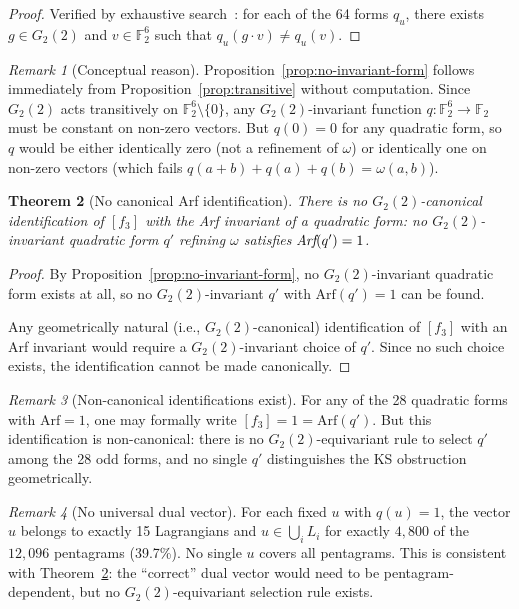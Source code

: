 \documentclass[11pt,a4paper]{article}
\newtheorem{theorem}{Theorem}[section]
\theoremstyle{remark}
\newtheorem{remark}[theorem]{Remark}
\newcommand{\F}{\mathbb{F}}
\begin{document}
\begin{proof}
Verified by exhaustive search~\cite{PaperXIIsuppl}: for each of the 64
forms $q_u$, there exists $g \in G_2(2)$ and $v \in \F_2^6$ such that
$q_u(g \cdot v) \neq q_u(v)$.
\end{proof}

\begin{remark}[Conceptual reason]
\label{rem:conceptual}
Proposition~\ref{prop:no-invariant-form} follows immediately from
Proposition~\ref{prop:transitive} without computation. Since $G_2(2)$
acts transitively on $\F_2^6 \setminus \{0\}$, any $G_2(2)$-invariant
function $q: \F_2^6 \to \F_2$ must be constant on non-zero vectors.
But $q(0) = 0$ for any quadratic form, so $q$ would be either
identically zero (not a refinement of $\omega$) or identically one on
non-zero vectors (which fails $q(a+b) + q(a) + q(b) = \omega(a,b)$).
\end{remark}

\begin{theorem}[No canonical Arf identification]
\label{thm:arf-fails}
There is no $G_2(2)$-canonical identification of $[f_3]$ with the Arf
invariant of a quadratic form: no $G_2(2)$-invariant quadratic form
$q'$ refining $\omega$ satisfies $\emph{Arf}(q') = 1$.
\end{theorem}

\begin{proof}
By Proposition~\ref{prop:no-invariant-form}, no $G_2(2)$-invariant
quadratic form exists at all, so no $G_2(2)$-invariant $q'$ with
$\text{Arf}(q') = 1$ can be found.

Any geometrically natural (i.e., $G_2(2)$-canonical) identification of
$[f_3]$ with an Arf invariant would require a $G_2(2)$-invariant choice
of $q'$. Since no such choice exists, the identification cannot be made
canonically.
\end{proof}

\begin{remark}[Non-canonical identifications exist]
\label{rem:noncanonical}
For any of the 28 quadratic forms with $\text{Arf} = 1$, one may
formally write $[f_3] = 1 = \text{Arf}(q')$. But this identification
is non-canonical: there is no $G_2(2)$-equivariant rule to select $q'$
among the 28 odd forms, and no single $q'$ distinguishes the KS
obstruction geometrically.
\end{remark}

\begin{remark}[No universal dual vector]
\label{rem:no-universal-u}
For each fixed $u$ with $q(u) = 1$, the vector $u$ belongs to exactly
15 Lagrangians and $u \in \bigcup_i L_i$ for exactly $4{,}800$ of the
$12{,}096$ pentagrams (39.7\%). No single $u$ covers all pentagrams.
This is consistent with Theorem~\ref{thm:arf-fails}: the ``correct''
dual vector would need to be pentagram-dependent, but no
$G_2(2)$-equivariant selection rule exists.
\end{remark}
\end{document}
